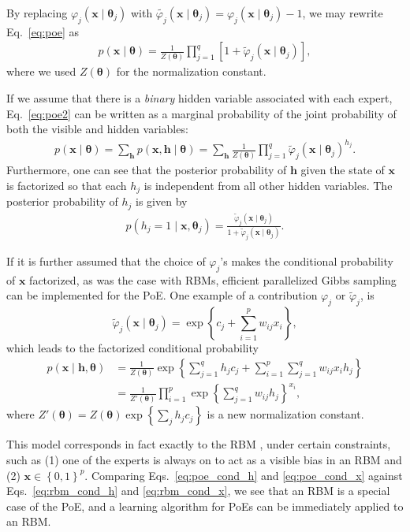 \documentclass{now}
\newcommand{\vect}[1]{\mathbf{#1}}
\newcommand{\vects}[1]{\boldsymbol{#1}}
\newcommand{\vh}[0]{\vect{h}}
\newcommand{\vx}[0]{\vect{x}}
\newcommand{\TT}[0]{{\vects{\theta}}}
\begin{document}
By replacing $\varphi_j(\vx \mid \TT_j)$ with
$\tilde{\varphi_j}(\vx \mid
\TT_j)=\varphi_j(\vx\mid\TT_j)-1$, we may rewrite
Eq.~\eqref{eq:poe} as
\begin{align}
    \label{eq:poe2}
    p(\vx \mid \TT) = \frac{1}{Z(\TT)}\prod_{j=1}^q \left[ 1 +
    \tilde{\varphi}_j(\vx \mid
    \TT_j)\right],
\end{align}
where we used $Z(\TT)$ for the normalization constant. 

If we assume that there is a \textit{binary} hidden variable
associated with each expert, Eq.~\eqref{eq:poe2} can be
written as a marginal probability of the joint
probability of both the visible and hidden variables:
\begin{align}
    \label{eq:poe2_joint}
    p(\vx \mid \TT) = \sum_{\vh} p(\vx, \vh \mid \TT) =
    \sum_{\vh} \frac{1}{Z(\TT)} \prod_{j=1}^q
    \tilde{\varphi}_j (\vx \mid \TT_j)^{h_j}.
\end{align}
Furthermore, one can 
see that the posterior
probability of $\vh$ given the state of $\vx$ is factorized
so that each $h_j$ is independent from all other hidden
variables. The posterior probability of $h_j$ is given by
\begin{align}
    \label{eq:poe_cond_h}
    p(h_j = 1 \mid \vx, \TT_j) = \frac{\tilde{\varphi}_j(\vx
    \mid \TT_j)}{1 + \tilde{\varphi}_j(\vx \mid \TT_j)}.
\end{align}

If it is further assumed that the choice of $\varphi_j$'s
makes the conditional probability of $\vx$ 
factorized, as was the case with RBMs, efficient 
parallelized Gibbs sampling can be implemented for the PoE.
One example of a contribution $\varphi_j$ or
$\tilde{\varphi}_j$, is 
\[
\tilde{\varphi}_j(\vx \mid \TT_j) = \exp\left\{ c_j +
\sum_{i=1}^p w_{ij} x_i \right\},
\]
which leads to the factorized conditional probability
\begin{align}
    \label{eq:poe_cond_x}
p(\vx \mid \vh, \TT) &= \frac{1}{Z(\TT)} \exp\left\{
\sum_{j=1}^q h_j c_j + \sum_{i=1}^p \sum_{j=1}^q w_{ij} x_i
h_j \right\} 
\nonumber \\
&= \frac{1}{Z'(\TT)} \prod_{i=1}^p \exp\left\{
\sum_{j=1}^q w_{ij} h_j
\right\}^{x_i},
\end{align}
where $Z'(\TT) = Z(\TT) \exp\left\{ \sum_j h_j c_j \right\}$
is a new normalization constant.

This model corresponds in fact exactly to the RBM
\citep{Freund1994}, under
certain constraints, such as (1) one of the experts is
always on to act as a visible bias in an RBM and (2) $\vx
\in \left\{ 0, 1 \right\}^p$. Comparing
Eqs.~\eqref{eq:poe_cond_h} and \eqref{eq:poe_cond_x} against
Eqs.~\eqref{eq:rbm_cond_h} and \eqref{eq:rbm_cond_x}, we see
that an RBM
is a special case of the PoE, and a learning algorithm for
PoEs can be immediately applied to an RBM.
\end{document}

